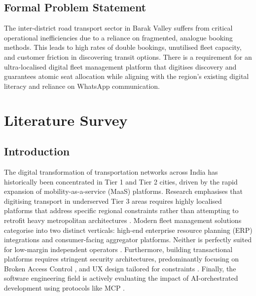 \documentclass[12pt, a4paper, oneside]{report}
\begin{document}
\section{Formal Problem Statement}
The inter-district road transport sector in Barak Valley suffers from critical operational inefficiencies due to a reliance on fragmented, analogue booking methods. This leads to high rates of double bookings, unutilised fleet capacity, and customer friction in discovering transit options. There is a requirement for an ultra-localised digital fleet management platform that digitises discovery and guarantees atomic seat allocation while aligning with the region's existing digital literacy and reliance on WhatsApp communication.

\chapter{Literature Survey}

\section{Introduction}
The digital transformation of transportation networks across India has historically been concentrated in Tier 1 and Tier 2 cities, driven by the rapid expansion of mobility-as-a-service (MaaS) platforms. Research emphasises that digitising transport in underserved Tier 3 areas requires highly localised platforms that address specific regional constraints rather than attempting to retrofit heavy metropolitan architectures \cite{transport_dig1}. Modern fleet management solutions categorise into two distinct verticals: high-end enterprise resource planning (ERP) integrations and consumer-facing aggregator platforms. Neither is perfectly suited for low-margin independent operators \cite{transport_dig2}. Furthermore, building transactional platforms requires stringent security architectures, predominantly focusing on Broken Access Control \cite{owasp}, and UX design tailored for constraints \cite{ux_mobile_first}. Finally, the software engineering field is actively evaluating the impact of AI-orchestrated development using protocols like MCP \cite{ai_software_eng}.
\end{document}
